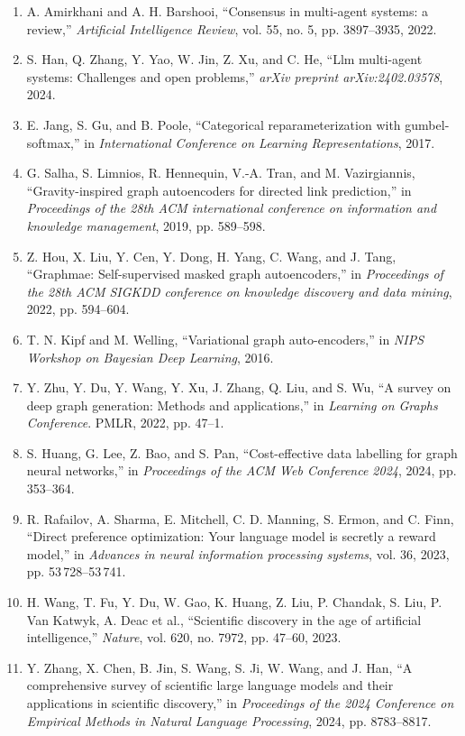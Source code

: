 \documentclass[10pt,UTF8,fontset=fandol]{ctexart}
\begin{document}
\begin{enumerate}[leftmargin=2.4em,labelsep=0.4em,itemsep=0.15em]
\item A. Amirkhani and A. H. Barshooi, ``Consensus in multi-agent systems: a review,'' \textit{Artificial Intelligence Review}, vol. 55, no. 5, pp. 3897--3935, 2022.
\item S. Han, Q. Zhang, Y. Yao, W. Jin, Z. Xu, and C. He, ``Llm multi-agent systems: Challenges and open problems,'' \textit{arXiv preprint arXiv:2402.03578}, 2024.
\item E. Jang, S. Gu, and B. Poole, ``Categorical reparameterization with gumbel-softmax,'' in \textit{International Conference on Learning Representations}, 2017.
\item G. Salha, S. Limnios, R. Hennequin, V.-A. Tran, and M. Vazirgiannis, ``Gravity-inspired graph autoencoders for directed link prediction,'' in \textit{Proceedings of the 28th ACM international conference on information and knowledge management}, 2019, pp. 589--598.
\item Z. Hou, X. Liu, Y. Cen, Y. Dong, H. Yang, C. Wang, and J. Tang, ``Graphmae: Self-supervised masked graph autoencoders,'' in \textit{Proceedings of the 28th ACM SIGKDD conference on knowledge discovery and data mining}, 2022, pp. 594--604.
\item T. N. Kipf and M. Welling, ``Variational graph auto-encoders,'' in \textit{NIPS Workshop on Bayesian Deep Learning}, 2016.
\item Y. Zhu, Y. Du, Y. Wang, Y. Xu, J. Zhang, Q. Liu, and S. Wu, ``A survey on deep graph generation: Methods and applications,'' in \textit{Learning on Graphs Conference}. PMLR, 2022, pp. 47--1.
\item S. Huang, G. Lee, Z. Bao, and S. Pan, ``Cost-effective data labelling for graph neural networks,'' in \textit{Proceedings of the ACM Web Conference 2024}, 2024, pp. 353--364.
\item R. Rafailov, A. Sharma, E. Mitchell, C. D. Manning, S. Ermon, and C. Finn, ``Direct preference optimization: Your language model is secretly a reward model,'' in \textit{Advances in neural information processing systems}, vol. 36, 2023, pp. 53\,728--53\,741.
\item H. Wang, T. Fu, Y. Du, W. Gao, K. Huang, Z. Liu, P. Chandak, S. Liu, P. Van Katwyk, A. Deac et al., ``Scientific discovery in the age of artificial intelligence,'' \textit{Nature}, vol. 620, no. 7972, pp. 47--60, 2023.
\item Y. Zhang, X. Chen, B. Jin, S. Wang, S. Ji, W. Wang, and J. Han, ``A comprehensive survey of scientific large language models and their applications in scientific discovery,'' in \textit{Proceedings of the 2024 Conference on Empirical Methods in Natural Language Processing}, 2024, pp. 8783--8817.

\end{enumerate}
\end{document}
